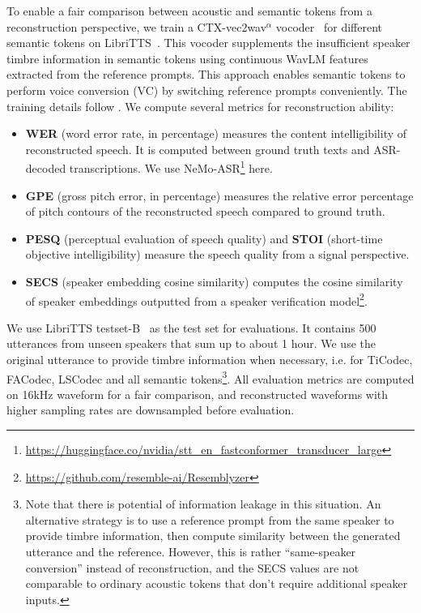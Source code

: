 To enable a fair comparison between acoustic and semantic tokens from a reconstruction perspective, we train a CTX-vec2wav$^\alpha$ vocoder~\cite{guo2024lscodec} for different semantic tokens on LibriTTS~\cite{libritts}.
This vocoder supplements the insufficient speaker timbre information in semantic tokens using continuous WavLM features extracted from the reference prompts.
This approach enables semantic tokens to perform voice conversion (VC) by switching reference prompts conveniently.
The training details follow \cite{du2024unicats}.
We compute several metrics for reconstruction ability:
\begin{itemize}
    \item \textbf{WER} (word error rate, in percentage) measures the content intelligibility of reconstructed speech. It is computed between ground truth texts and ASR-decoded transcriptions. We use NeMo-ASR\footnote{\scriptsize\url{https://huggingface.co/nvidia/stt_en_fastconformer_transducer_large}} here.
    \item \textbf{GPE} (gross pitch error, in percentage) measures the relative error percentage of pitch contours of the reconstructed speech compared to ground truth.
    \item \textbf{PESQ} (perceptual evaluation of speech quality) and \textbf{STOI} (short-time objective intelligibility) measure the speech quality from a signal perspective.
    \item \textbf{SECS} (speaker embedding cosine similarity) computes the cosine similarity of speaker embeddings outputted from a speaker verification model\footnote{\scriptsize\url{https://github.com/resemble-ai/Resemblyzer}}.
\end{itemize}
We use LibriTTS testset-B~ \cite{du2024unicats} as the test set for evaluations.
It contains 500 utterances from unseen speakers that sum up to about 1 hour.
We use the original utterance to provide timbre information when necessary, i.e. for TiCodec, FACodec, LSCodec and all semantic tokens\footnote{Note that there is potential of information leakage in this situation. An alternative strategy is to use a reference prompt from the same speaker to provide timbre information, then compute similarity between the generated utterance and the reference. 
However, this is rather ``same-speaker conversion'' instead of reconstruction, and the SECS values are not comparable to ordinary acoustic tokens that don't require additional speaker inputs.}.
All evaluation metrics are computed on 16kHz waveform for a fair comparison, and reconstructed waveforms with higher sampling rates are downsampled before evaluation.

